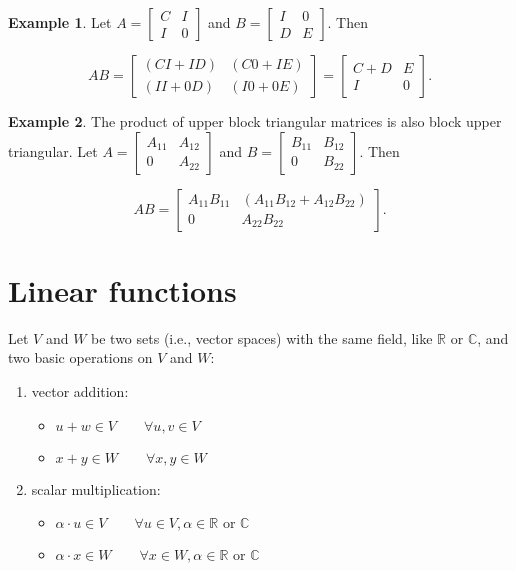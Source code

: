 \documentclass[12pt]{article}
\theoremstyle{definition}
\newtheorem*{example}{Example}
\begin{document}
\begin{example}
Let $A = \begin{bmatrix} C & I \\ I & 0 \end{bmatrix}$ and $B = \begin{bmatrix} I & 0 \\ D & E \end{bmatrix}$. Then

\[
AB = 
\begin{bmatrix}
( CI + ID ) & ( C0 + IE ) \\
( II + 0D ) & ( I0 + 0E )
\end{bmatrix}
=
\begin{bmatrix}
C + D & E \\
I & 0
\end{bmatrix}.
\]
\end{example}

\begin{example}
The product of upper block triangular matrices is also block upper triangular. Let
$A = \begin{bmatrix} A_{11} & A_{12} \\ 0 & A_{22} \end{bmatrix}$ and 
$B = \begin{bmatrix} B_{11} & B_{12} \\ 0 & B_{22} \end{bmatrix}$. Then

\[
AB =
\begin{bmatrix}
A_{11} B_{11} & ( A_{11} B_{12} + A_{12} B_{22} ) \\
0 & A_{22} B_{22}
\end{bmatrix}.
\]
\end{example}

\section{Linear functions}

Let $V$ and $W$ be two sets (i.e., vector spaces) with the same field, like $\mathbb{R}$ or $\mathbb{C}$,
and two basic operations on $V$ and $W$:

\begin{enumerate}

\item vector addition:
\begin{itemize}
\item[] $u + w \in V \quad \quad \forall u, v \in V$
\item[] $x + y \in W \quad \quad \forall x, y \in W$
\end{itemize}

\item scalar multiplication:
\begin{itemize}
\item[] $\alpha \cdot u \in V \quad \quad \forall u \in V, \alpha \in \mathbb{R} \text{ or } \mathbb{C}$
\item[] $\alpha \cdot x \in W \quad \quad \forall x \in W, \alpha \in \mathbb{R} \text{ or } \mathbb{C}$
\end{itemize}

\end{enumerate}
\end{document}
